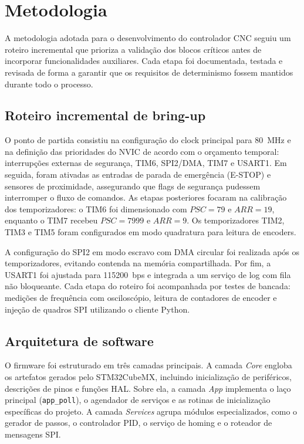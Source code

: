 \chapter{Metodologia}\label{cap:metodologia}

A metodologia adotada para o desenvolvimento do controlador CNC seguiu
um roteiro incremental que prioriza a validação dos blocos críticos antes
de incorporar funcionalidades auxiliares. Cada etapa foi documentada,
testada e revisada de forma a garantir que os requisitos de determinismo
fossem mantidos durante todo o processo.

\section{Roteiro incremental de bring-up}

O ponto de partida consistiu na configuração do clock principal para
\SI{80}{\mega\hertz} e na definição das prioridades do NVIC de acordo
com o orçamento temporal: interrupções externas de segurança, TIM6,
SPI2/DMA, TIM7 e USART1. Em seguida, foram ativadas as entradas de parada
de emergência (E-STOP) e sensores de proximidade, assegurando que flags
de segurança pudessem interromper o fluxo de comandos. As etapas
posteriores focaram na calibração dos temporizadores: o TIM6 foi
dimensionado com $PSC = 79$ e $ARR = 19$, enquanto o TIM7 recebeu
$PSC = 7999$ e $ARR = 9$. Os temporizadores TIM2, TIM3 e TIM5 foram
configurados em modo quadratura para leitura de encoders.

A configuração do SPI2 em modo escravo com DMA circular foi realizada
após os temporizadores, evitando contenda na memória compartilhada.
Por fim, a USART1 foi ajustada para \SI{115200}{bps} e integrada a um
serviço de log com fila não bloqueante. Cada etapa do roteiro foi
acompanhada por testes de bancada: medições de frequência com
osciloscópio, leitura de contadores de encoder e injeção de quadros SPI
utilizando o cliente Python.

\section{Arquitetura de software}

O firmware foi estruturado em três camadas principais. A camada \emph{Core}
engloba os artefatos gerados pelo STM32CubeMX, incluindo inicialização de
periféricos, descrições de pinos e funções HAL. Sobre ela, a camada
\emph{App} implementa o laço principal (\texttt{app\_poll}), o agendador de
serviços e as rotinas de inicialização específicas do projeto. A camada
\emph{Services} agrupa módulos especializados, como o gerador de passos,
o controlador PID, o serviço de homing e o roteador de mensagens SPI.

